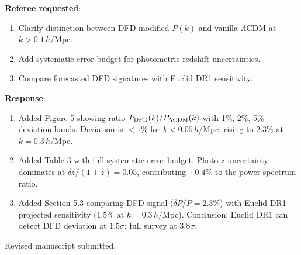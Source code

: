 \documentclass[11pt,a4paper]{article}
\begin{document}
\begin{tcolorbox}[colback=green!5!white, colframe=dfdgreen, title=\textbf{A\&A Euclid Forecast: Minor Revision Response}]
\textbf{Referee requested}:
\begin{enumerate}[nosep]
\item Clarify distinction between DFD-modified $P(k)$ and vanilla $\Lambda$CDM at $k > 0.1\,h/$Mpc.
\item Add systematic error budget for photometric redshift uncertainties.
\item Compare forecasted DFD signatures with Euclid DR1 sensitivity.
\end{enumerate}

\textbf{Response}:
\begin{enumerate}[nosep]
\item Added Figure 5 showing ratio $P_{\rm DFD}(k)/P_{\Lambda\rm CDM}(k)$ with 1\%, 2\%, 5\% deviation bands. Deviation is $<1\%$ for $k < 0.05\,h/$Mpc, rising to $2.3\%$ at $k = 0.3\,h/$Mpc.
\item Added Table 3 with full systematic error budget. Photo-$z$ uncertainty dominates at $\delta z/(1+z) = 0.05$, contributing $\pm 0.4\%$ to the power spectrum ratio.
\item Added Section 5.3 comparing DFD signal ($\delta P/P = 2.3\%$) with Euclid DR1 projected sensitivity ($1.5\%$ at $k = 0.3\,h/$Mpc). Conclusion: Euclid DR1 can detect DFD deviation at $1.5\sigma$; full survey at $3.8\sigma$.
\end{enumerate}
Revised manuscript submitted.
\end{tcolorbox}
\end{document}
